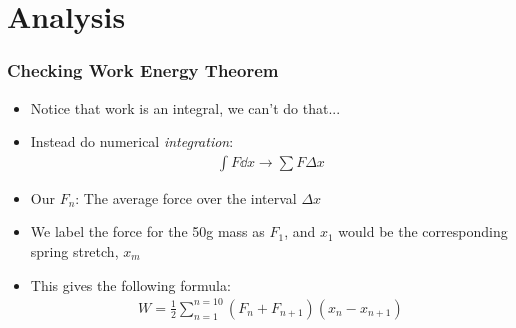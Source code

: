 \documentclass[handout,aspectratio=169]{beamer}
\begin{document}
\section{Analysis}
\begin{frame}
  \frametitle{Checking Work Energy Theorem}
  \begin{itemize}
  \item Notice that work is an integral, we can't do that...
  \item Instead do numerical \emph{integration}:
    \begin{align*}
      \int F\dd{x}\to\sum F\Delta{x}
    \end{align*}
  \item Our $F_n$: The average force over the interval $\Delta{x}$
  \item We label the force for the 50g mass as $F_1$, and $x_1$ would be the corresponding spring stretch, $x_m$
  \item This gives the following formula:
    \begin{align*}
      W=\frac12\sum_{n=1}^{n=10}(F_n+F_{n+1})(x_n-x_{n+1})
    \end{align*}
  \end{itemize}
\end{frame}
\end{document}
